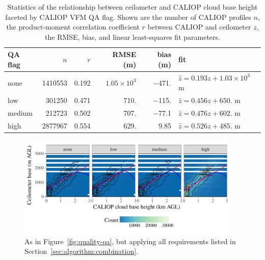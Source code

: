 \documentclass[essd,manuscript]{copernicus}\usepackage[]{graphicx}\usepackage[]{color}
\newenvironment{knitrout}{}{} %
\newcommand\CBH{\ensuremath{z}}
\begin{document}
\begin{table}
  \centering
  \caption{Statistics of the relationship between ceilometer and CALIOP cloud
    base height faceted by CALIOP VFM QA flag.  Shown are the number of CALIOP
    profiles $n$, the product-moment correlation coefficient $r$ between CALIOP
    and ceilometer \CBH{}, the RMSE, bias, and linear least-squares
    fit parameters.}
  \label{tab:quality-qa}
\begin{tabular}{lrrrrl}
  \hline
\hline
QA flag & $n$ & $r$ & RMSE (m) & bias (m) & fit \\ 
  \hline
none & 1410553 & 0.192 & $1.05 \times 10^{3}$ & $-$471. & $\hat{z} = 0.193 z + \ensuremath{1.03 \times 10^{3}}$ m \\ 
  low & 301250 & 0.471 & 710. & $-$115. & $\hat{z} = 0.456 z + 650.$ m \\ 
  medium & 212723 & 0.502 & 707. & $-$77.1 & $\hat{z} = 0.476 z + 602.$ m \\ 
  high & 2877967 & 0.554 & 629. & 9.85 & $\hat{z} = 0.526 z + 485.$ m \\ 
   \hline
\hline
\end{tabular}

\end{table}

\begin{figure}
  \centering
\begin{knitrout}
\color{fgcolor}

{\centering \includegraphics[width=0.95\textwidth]{figure/method-eval-qual-after-other-cuts-1} 

}



\end{knitrout}
  \caption{As in Figure~\ref{fig:quality-qa}, but applying all 
    requirements listed in Section~\ref{sec:algorithm:combination}.}
  \label{fig:quality-qa-other-cuts}
\end{figure}
\end{document}
